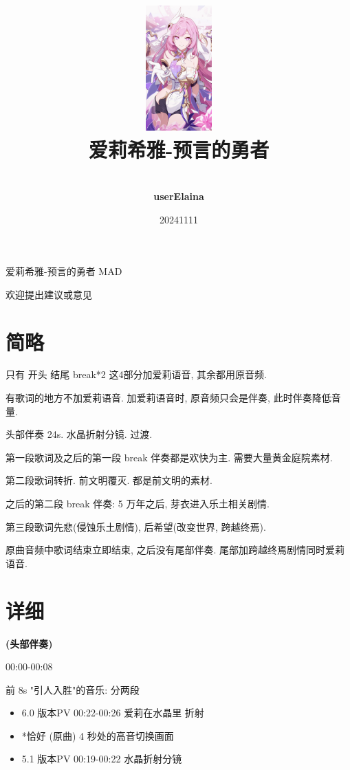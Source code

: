 \documentclass[a4paper]{article}
\title{
    \vspace*{1.0in}
    \includegraphics[width=1in]{figures/100154449_p0.jpg} \\
    \vspace*{1in}
    \textbf{\Huge 爱莉希雅-预言的勇者}
    \vspace{0.5in}
}
\author{ \\
    \textbf{\huge userElaina} \\
    \vspace*{1in}
}
\date{\LARGE 20241111}
\begin{document}
\LARGE

\maketitle
\tableofcontents
\thispagestyle{empty}
\newpage

爱莉希雅-预言的勇者 MAD

欢迎提出建议或意见




\section{简略}

只有 开头 结尾 break*2 这4部分加爱莉语音, 其余都用原音频.

有歌词的地方不加爱莉语音. 加爱莉语音时, 原音频只会是伴奏, 此时伴奏降低音量.

头部伴奏 24s. 水晶折射分镜. 过渡.

第一段歌词及之后的第一段 break 伴奏都是欢快为主. 需要大量黄金庭院素材.

第二段歌词转折. 前文明覆灭. 都是前文明的素材.

之后的第二段 break 伴奏: 5 万年之后, 芽衣进入乐土相关剧情.

第三段歌词先悲(侵蚀乐土剧情), 后希望(改变世界, 跨越终焉).

原曲音频中歌词结束立即结束, 之后没有尾部伴奏. 尾部加跨越终焉剧情同时爱莉语音.

\section{详细}

\textbf{(头部伴奏)}

00:00-00:08

前 8s "引人入胜"的音乐: 分两段

\begin{itemize}
    \item 6.0 版本PV 00:22-00:26 爱莉在水晶里 折射
    \item *恰好 (原曲) 4 秒处的高音切换画面
    \item 5.1 版本PV 00:19-00:22 水晶折射分镜
\end{itemize}
\end{document}

